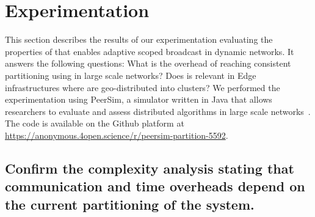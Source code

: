 
\section{Experimentation}
\label{sec:experimentation}

This section describes the results of our experimentation evaluating
the properties of \NAME that enables adaptive scoped broadcast in
dynamic networks. It answers the following questions: What is the
overhead of reaching consistent partitioning using \NAME in large
scale networks?  Does \NAME is relevant in Edge infrastructures where
\processes are geo-distributed into clusters? We performed the
experimentation using PeerSim, a simulator written in Java that allows
researchers to evaluate and assess distributed algorithms in large
scale networks~\cite{montresor2009peersim}. The code is available on
the Github platform at
\url{https://anonymous.4open.science/r/peersim-partition-5592}.

\subsection{Confirm the complexity analysis stating that
  communication and time overheads depend on the current partitioning
  of the system.}

